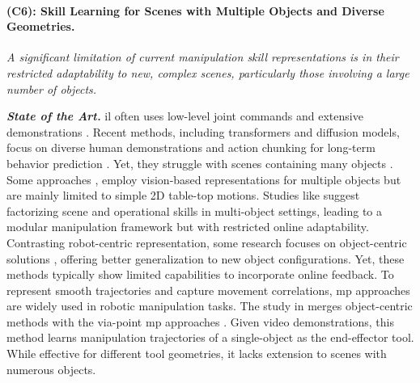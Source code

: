 \documentclass{erc-B2}
\begin{document}
\paragraph{(C6): Skill Learning for Scenes with Multiple Objects and Diverse Geometries.} 
\textit{
A significant limitation of current manipulation skill representations is in their restricted adaptability to new, complex scenes, particularly those involving a large number of objects.}%

\textit{\textbf{State of the Art.}}
\gls*{il} often uses low-level joint commands and extensive demonstrations \cite{David2024}. Recent methods, including transformers and diffusion models, focus on diverse human demonstrations and action chunking for long-term behavior prediction \cite{shafiullah2022behavior, chi2023diffusion, pearce2023imitating}. Yet, they struggle with scenes containing many objects \cite{David2024}. Some approaches \cite{zeng2018learning, David2024, zeng2020tossingbot, serhan2022push,rtx2023arxiv}, employ vision-based representations for multiple objects but are mainly limited to simple 2D table-top motions. Studies like \cite{zhu2023viola} suggest factorizing scene and operational skills in multi-object settings, leading to a modular manipulation framework but with restricted online adaptability.
Contrasting robot-centric representation, some research focuses on object-centric solutions \cite{Jianfeng2023KVIL, mandlekar2023mimicgen}, offering better generalization to new object configurations. Yet, these methods typically show limited capabilities to incorporate online feedback. 
To represent smooth trajectories and capture movement correlations, \gls*{mp} approaches \cite{schaal2006dynamic, paraschos2013probabilistic,li2023prodmp} are widely used in robotic manipulation tasks. The study in \cite{Jianfeng2023KVIL} merges object-centric methods with the via-point \gls*{mp} approaches \cite{zhou2019learning}. Given video demonstrations, this method learns manipulation trajectories of a single-object as the end-effector tool. While effective for different tool geometries, it lacks extension to scenes with numerous objects.

\end{document}
